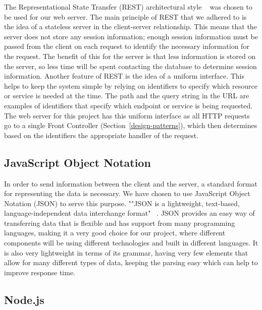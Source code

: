 \documentclass[12pt]{report}
\let\Oldsubsection\subsection
\renewcommand{\subsection}{\FloatBarrier\Oldsubsection}
\begin{document}
The Representational State Transfer (REST) architectural style ~\autocite{RESTARCHSTYLE} was chosen to be used
for our web server. The main principle of REST that we adhered to is the idea of a stateless
server in the client-server relationship. This means that the server does not store any session
information; enough session information must be passed from the client on each request to
identify the necessary information for the request. The benefit of this for the server is that less
information is stored on the server, so less time will be spent contacting the database to
determine session information. Another feature of REST is the idea of a uniform interface. This
helps to keep the system simple by relying on identifiers to specify which resource or service is
needed at the time. The path and the query string in the URL are examples of identifiers that
specify which endpoint or service is being requested. The web server for this project has this
uniform interface as all HTTP requests go to a single Front Controller (Section~\ref{design-patterns}), which
then determines based on the identifiers the appropriate handler of the request.

\subsection{JavaScript Object Notation} \label{javascript-object-notation}

In order to send information between the client and the server, a standard format for
representing the data is necessary. We have chosen to use JavaScript Object Notation (JSON) to
serve this purpose. ""JSON is a lightweight, text-based, language-independent data interchange
format" ~\autocite{JSONREF}. JSON provides an easy way of transferring data that is flexible and has support
from many programming languages, making it a very good choice for our project, where
different components will be using different technologies and built in different languages. It is
also very lightweight in terms of its grammar, having very few elements that allow for many
different types of data, keeping the parsing easy which can help to improve response time.

\subsection{Node.js} \label{node.js}
\end{document}
